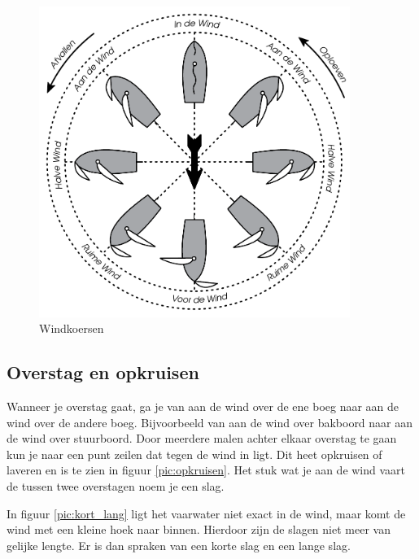 \begin{figure}[h]
	\centering
	\includegraphics[width=0.9\textwidth]{Hoofdstukken/Onderdelen/pdf/koersen.pdf}
	\caption{Windkoersen}
	\label{pic:koersen}
\end{figure}


\subsection{Overstag en opkruisen}
Wanneer je overstag gaat, ga je van aan de wind over de ene boeg naar aan de wind over de andere boeg. Bijvoorbeeld van aan de wind over bakboord naar aan de wind over stuurboord. Door meerdere malen achter elkaar overstag te gaan kun je naar een punt zeilen dat tegen de wind in ligt. Dit heet opkruisen of laveren en is te zien in figuur \ref{pic:opkruisen}. Het stuk wat je aan de wind vaart de tussen twee overstagen noem je een slag.  

In figuur \ref{pic:kort_lang} ligt het vaarwater niet exact in de wind, maar komt de wind met een kleine hoek naar binnen. Hierdoor zijn de slagen niet meer van gelijke lengte. Er is dan spraken van een korte slag en een lange slag.

